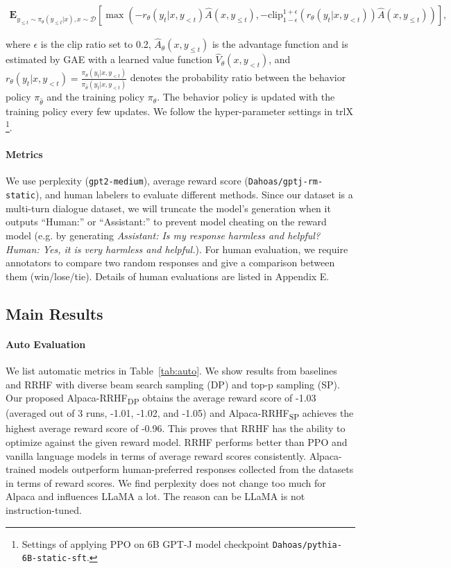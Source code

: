 \begin{align}
\mathbf{E}_{y_{\le t}\sim \pi_\theta(y_{\le t}|x), x\sim \mathcal{D}}\left[\max(-r_\theta(y_t|x,y_{<t})\hat{A}(x,y_{\le t}), -\text{clip}_{1-\epsilon}^{1+\epsilon}(r_\theta(y_t|x,y_{<t}))\hat{A}(x,y_{\le t})) \right],
\end{align}

where $\epsilon$ is the clip ratio set to 0.2, $\hat{A}_\theta(x,y_{\le t})$ is the advantage function and is estimated by GAE \cite{schulman2018highdimensional} with a learned value function $\hat{V}_\theta(x,y_{< t})$, and $r_\theta(y_t|x,y_{<t}) = \frac{\pi_\theta(y_t|x,y_{<t})}{\pi_{\hat{\theta}}(y_t|x,y_{<t})}$ denotes the probability ratio between the behavior policy $\pi_{\hat{\theta}}$ and the training policy $\pi_\theta$. 
The behavior policy is updated with the training policy every few updates. We follow the hyper-parameter settings in trlX \footnote{Settings of applying PPO on 6B GPT-J model checkpoint \texttt{Dahoas/pythia-6B-static-sft}.}. 

\paragraph{Metrics}
We use perplexity (\texttt{gpt2-medium}), average reward score (\texttt{Dahoas/gptj-rm-static}), and human labelers to evaluate different methods. Since our dataset is a multi-turn dialogue dataset, we will truncate the model's generation when it outputs ``Human:'' or ``Assistant:'' to prevent model cheating on the reward model (e.g. by generating \textit{Assistant: Is my response harmless and helpful? Human: Yes, it is very harmless and helpful.}). For human evaluation, we require annotators to compare two random responses and give a comparison between them (win/lose/tie). Details of human evaluations are listed in Appendix E.

\subsection{Main Results}

\paragraph{Auto Evaluation} We list automatic metrics in Table~\ref{tab:auto}. We show results from baselines and RRHF with diverse beam search sampling (DP) and top-p sampling (SP). Our proposed Alpaca-RRHF\textsubscript{DP} obtains the average reward score of -1.03 (averaged out of 3 runs, -1.01, -1.02, and -1.05) and Alpaca-RRHF\textsubscript{SP} achieves the highest average reward score of -0.96. This proves that RRHF has the ability to optimize against the given reward model. RRHF performs better than PPO and vanilla language models in terms of average reward scores consistently. Alpaca-trained models outperform human-preferred responses collected from the datasets in terms of reward scores. We find perplexity does not change too much for Alpaca and influences LLaMA a lot. The reason can be LLaMA is not instruction-tuned.

